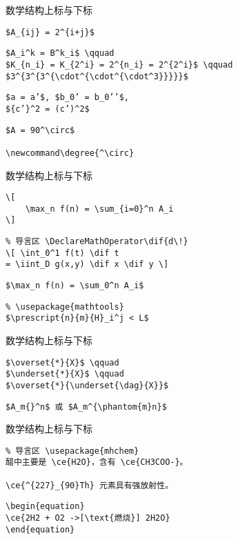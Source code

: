 \documentclass[11pt]{beamer}
\begin{document}
\begin{frame}[fragile]{数学结构}{上标与下标}
\begin{lstlisting}
$A_{ij} = 2^{i+j}$
\end{lstlisting}

\begin{lstlisting}
$A_i^k = B^k_i$ \qquad
$K_{n_i} = K_{2^i} = 2^{n_i} = 2^{2^i}$ \qquad
$3^{3^{3^{\cdot^{\cdot^{\cdot^3}}}}}$
\end{lstlisting}
\begin{lstlisting}
$a = a’$, $b_0’ = b_0’’$,
${c’}^2 = (c’)^2$
\end{lstlisting}
\begin{lstlisting}
$A = 90^\circ$

\newcommand\degree{^\circ}
\end{lstlisting}
\end{frame}

\begin{frame}[fragile]{数学结构}{上标与下标}
\begin{lstlisting}
\[
	\max_n f(n) = \sum_{i=0}^n A_i
\]
\end{lstlisting}
\begin{lstlisting}
% 导言区 \DeclareMathOperator\dif{d\!}
\[ \int_0^1 f(t) \dif t
= \iint_D g(x,y) \dif x \dif y \]
\end{lstlisting}
\begin{lstlisting}
$\max_n f(n) = \sum_0^n A_i$
\end{lstlisting}
\begin{lstlisting}
% \usepackage{mathtools}
$\prescript{n}{m}{H}_i^j < L$
\end{lstlisting}
\end{frame}

\begin{frame}[fragile]{数学结构}{上标与下标}
\begin{lstlisting}
$\overset{*}{X}$ \qquad
$\underset{*}{X}$ \qquad
$\overset{*}{\underset{\dag}{X}}$
\end{lstlisting}
\begin{lstlisting}
$A_m{}^n$ 或 $A_m^{\phantom{m}n}$
\end{lstlisting}
\end{frame}

\begin{frame}[fragile]{数学结构}{上标与下标}
\begin{lstlisting}
% 导言区 \usepackage{mhchem}
醋中主要是 \ce{H2O}，含有 \ce{CH3COO-}。

\ce{^{227}_{90}Th} 元素具有强放射性。
\end{lstlisting}
\begin{lstlisting}
\begin{equation}
\ce{2H2 + O2 ->[\text{燃烧}] 2H2O}
\end{equation}
\end{lstlisting}
\end{frame}
\end{document}
